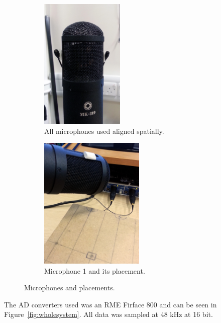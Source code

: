\begin{figure}
\centering
\begin{subfigure}{.5\textwidth}
  \centering
  \includegraphics[width=4cm]{micsAlign}%
  \caption{All microphones used aligned spatially.}
  \label{fig:micsaligned}
\end{subfigure}%
\begin{subfigure}{.5\textwidth}
  \centering
  \includegraphics[width=5cm]{mic1}%
  \caption{Microphone 1 and its placement.}
  \label{fig:mic1}
\end{subfigure}
\caption{Microphones and placements.}
\label{fig:mic123}
\end{figure}

The AD converters used was an RME Firface 800 and can be seen in Figure~\ref{fig:wholesystem}. All data was sampled at 48 kHz at 16 bit.


